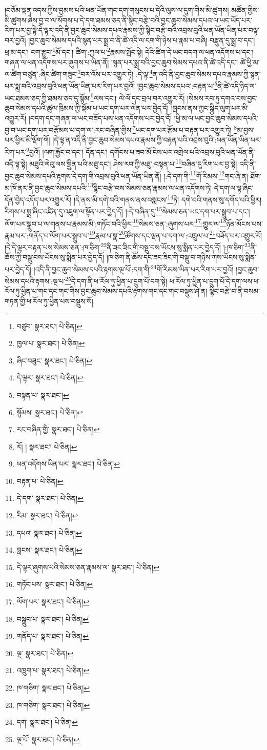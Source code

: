 །བཅོམ་ལྡན་འདས་ཀྱིས་བྱམས་པའི་ཕན་ཡོན་གང་དག་གསུངས་པ་དེའི་ལུས་ལ་དུག་གིས་མི་ཚུགས། མཚོན་གྱིས་མི་ཚུགས་ཞེས་བྱ་བ་ལ་སོགས་པ་དེ་དག་ཐམས་ཅད་ནི་སྙིང་བརྩེ་བའི་བྱང་ཆུབ་སེམས་དཔའ་ལ་ཡང་ཡོད་པར་རིག་པར་བྱ་སྟེ་དེ་ལྟར་འདི་ནི་བྱང་ཆུབ་སེམས་དཔའ་རྣམས་ཀྱི་སྙིང་བརྩེ་བའི་འབྲས་བུའི་ཕན་ཡོན་ཡིན་པར་བལྟ་བར་བྱའོ། །བྱང་ཆུབ་སེམས་དཔའི་སྙན་པར་སྨྲ་བ་ནི་ཚེ་འདི་ལ་ངག་གི་ཉེས་པ་རྣམ་པ་བཞི། བརྫུན་དུ་སྨྲ་བ་དང་། ཕྲ་མ་དང་། ངག་རྩུབ་\footnote{བཙུབ་  སྣར་ཐང་།  པེ་ཅིན། }མོ་དང་། ཚིག་:ཀྱལ་པ་\footnote{ཁྱལ་པ་  སྣར་ཐང་།  པེ་ཅིན། }རྣམས་སྤོང་སྟེ། དེའི་ཚིག་དེ་ཡང་བདག་ལ་ཕན་འདོགས་པ་དང་། གཞན་ལ་ཕན་འདོགས་པར་ཞུགས་པ་ཡིན་ནོ། །སྙན་པར་སྨྲ་བའི་བྱང་ཆུབ་སེམས་དཔའ་ནི་ཚེ་འདི་དང་། ཚེ་ཕྱི་མ་ལ་ཚིག་བཙུན་:ཞིང་ཚིག་གཟུང་\footnote{ཞིང་བཟུང་  སྣར་ཐང་།  པེ་ཅིན། }བར་འོས་པར་འགྱུར་ཏེ། :དེ་ལྟ་\footnote{དེ་ལྟར་  སྣར་ཐང་།  པེ་ཅིན། }ན་འདི་ནི་བྱང་ཆུབ་སེམས་དཔའ་རྣམས་ཀྱི་སྙན་པར་སྨྲ་བའི་འབྲས་བུའི་ཕན་ཡོན་ཡིན་པར་རིག་པར་བྱའོ། །བྱང་ཆུབ་སེམས་དཔའ་:བརྟན་པ་\footnote{བསྟན་པ་  སྣར་ཐང་། }ནི་ཚེ་འདི་ཉིད་ལ་ཡང་ཐམས་ཅད་ཀྱི་ཐམས་ཅད་དུ་སྙོམ་\footnote{སྙོམས་  སྣར་ཐང་།  པེ་ཅིན། }ལས་དང་། ལེ་ལོ་དང་བྲལ་བར་འགྱུར་རོ། །སེམས་རབ་ཏུ་དགའ་བས་བྱང་ཆུབ་སེམས་དཔའི་ཚུལ་ཁྲིམས་ཀྱི་སྡོམ་པ་ཡང་དག་པར་ལེན་པར་བྱེད་དོ། །བླངས་ནས་ཀྱང་སྒྱིད་ལུག་པར་མི་འགྱུར་རོ། །བདག་དང་གཞན་ལ་ཡང་བཟོད་པས་ཕན་འདོགས་པར་བྱེད་དོ། །ཕྱི་མ་ལ་ཡང་བྱང་ཆུབ་སེམས་དཔའི་བྱ་བ་ཡང་དག་པར་བརྩོམས་པ་དག་ལ་:རང་བཞིན་གྱིས་\footnote{རང་བཞིན་གྱི་  སྣར་ཐང་།  པེ་ཅིན། }ཡང་དག་པར་རྩོམ་པ་བརྟན་པར་འགྱུར་ཏེ། \footnote{རོ། །   སྣར་ཐང་།  པེ་ཅིན། }མ་བྱས་པར་ཕྱིར་མི་ལྡོག་གོ། །དེ་ལྟ་ན་འདི་ནི་བྱང་ཆུབ་སེམས་དཔའ་རྣམས་ཀྱི་བརྟན་པའི་འབྲས་བུའི་:ཕན་ཡོན་ཡིན་པར་རིག་པར་\footnote{ཕན་འདོགས་ཡིན་པར་  སྣར་ཐང་།  པེ་ཅིན། }བྱའོ། །ལག་རྐྱོང་བ་དང་། དོན་དང་། དགོངས་པ་ཟབ་མོ་ངེས་པར་འགྲེལ་པའི་འབྲས་བུའི་ཕན་ཡོན་ནི་འདི་ལྟ་སྟེ། མཐུའི་ལེའུ་ལས་སྦྱིན་པའི་མཐུ་དང་། ཤེས་རབ་ཀྱི་མཐུ་:བསྟན་པ་\footnote{བརྟན་པ་  པེ་ཅིན། }བཞིན་དུ་རིག་པར་བྱ་སྟེ། འདི་ནི་བྱང་ཆུབ་སེམས་དཔའི་རྟགས་དེ་དག་གི་འབྲས་བུའི་ཕན་ཡོན་ཡིན་ནོ། །:དེ་དག་གི་\footnote{དེ་དག་  སྣར་ཐང་།  པེ་ཅིན། }གོ་རིམས་\footnote{རིམ་  སྣར་ཐང་།  པེ་ཅིན། }གང་ཞེ་ན། ཐོག་མ་ཁོ་ནར་ནི་བྱང་ཆུབ་སེམས་དཔའི་\footnote{དཔའ་  སྣར་ཐང་།  པེ་ཅིན། }སྙིང་བརྩེ་བས་སེམས་ཅན་རྣམས་ལ་ཕན་འདོགས་ཏེ། དེ་དག་ལ་ལྟ་ཞིང་དོན་བྱེད་འདོད་པར་འགྱུར་རོ། །དེ་ནས་མི་དགེ་བའི་གནས་ནས་བསླངས་\footnote{བླངས་  སྣར་ཐང་།  པེ་ཅིན། }ཏེ། དགེ་བའི་གནས་སུ་དགོད་པའི་ཕྱིར། རིགས་པ་སྨྲ་ཞིང་འཛིན་དུ་འཇུག་ལ་སྟོན་པར་བྱེད་དོ། །:དེ་བཞིན་དུ་\footnote{དེ་ལྟར་ཞུགས་པའི་སེམས་ཅན་རྣམས་ལ་  སྣར་ཐང་།  པེ་ཅིན། }སེམས་ཅན་ཡང་དག་པར་སྒྲུབ་པ་དང་། ལོག་པར་སྒྲུབ་པ་ལ་གནས་པ་རྣམས་མི་:གཏོང་བའི་ཕྱིར་\footnote{གཏོང་པས་  སྣར་ཐང་།  པེ་ཅིན། }སེམས་ཅན་:ཞུགས་པར་\footnote{ལོག་པར་  སྣར་ཐང་།  པེ་ཅིན། }:གྱུར་ལ་\footnote{བསྒྲུབ་པ་  སྣར་ཐང་།  པེ་ཅིན། }ཉོན་མོངས་པས་རྣམ་པར་:གནོད་པ་ལོག་པར་སྒྲུབ་པ་\footnote{གནོད་པ་  སྣར་ཐང་།  པེ་ཅིན། }རྣམ་པ་སྣ་\footnote{ལྔ་  སྣར་ཐང་།  པེ་ཅིན། }ཚོགས་དང་ལྡན་པ་དག་ལ་:འཁྲུལ་པ་\footnote{འཁྲུག་པ་  སྣར་ཐང་།  པེ་ཅིན། }བཟོད་པར་འགྱུར་རོ། །དེ་དེ་ལྟར་བརྟན་པས་སེམས་ཅན་:ཁ་ཅིག་\footnote{ཁ་གཅིག་  སྣར་ཐང་།  པེ་ཅིན། }ནི་ཟང་ཟིང་གི་བསྡུ་བས་ཡོངས་སུ་སྨིན་པར་བྱེད་དོ། །:ཁ་ཅིག་\footnote{ཁ་གཅིག་  སྣར་ཐང་།  པེ་ཅིན། }ནི་ཆོས་ཀྱི་བསྡུ་བས་ཡོངས་སུ་སྨིན་པར་བྱེད་དོ། །ཁ་ཅིག་ནི་ཆོས་དང་ཟང་ཟིང་གི་བསྡུ་བ་གཉིས་ཀས་ཡོངས་སུ་སྨིན་པར་བྱེད་དོ། །འདི་ནི་བྱང་ཆུབ་སེམས་དཔའི་རྟགས་ལྔ་པོ་:དག་གི་\footnote{དག་  སྣར་ཐང་།  པེ་ཅིན། }གོ་རིམས་ཡིན་པར་རིག་པར་བྱའོ། །བྱང་ཆུབ་སེམས་དཔའི་རྟགས་:ལྔ་པ་\footnote{ལྔ་པོ་  སྣར་ཐང་།  པེ་ཅིན། }དེ་དག་ནི་ཕ་རོལ་ཏུ་ཕྱིན་པ་དྲུག་པོ་དག་སྟེ། ཕ་རོལ་ཏུ་ཕྱིན་པ་དྲུག་པོ་དེ་དག་ལས་ཕ་རོལ་ཏུ་ཕྱིན་པ་གང་དང་གང་གིས་བྱང་ཆུབ་སེམས་དཔའི་རྟགས་གང་དང་གང་བསྡུས་ཤེ་ན། སྙིང་བརྩེ་བ་ནི་བསམ་གཏན་གྱི་ཕ་རོལ་ཏུ་ཕྱིན་པས་བསྡུས་སོ། 